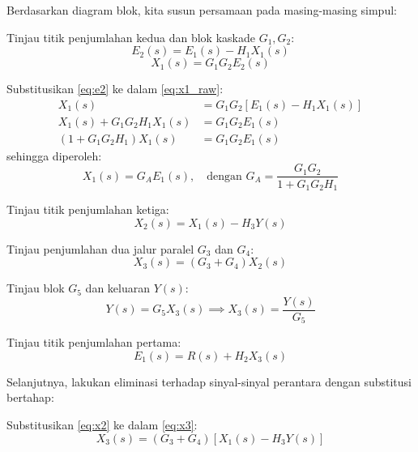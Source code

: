 \documentclass[11pt,a4paper]{article}
\begin{document}
Berdasarkan diagram blok, kita susun persamaan pada masing-masing simpul:

Tinjau titik penjumlahan kedua dan blok kaskade $G_1, G_2$:
\begin{equation}
    \label{eq:e2}
    E_2(s) = E_1(s) - H_1 X_1(s)
\end{equation}
\begin{equation}
    \label{eq:x1_raw}
    X_1(s) = G_1 G_2 E_2(s)
\end{equation}

Substitusikan \eqref{eq:e2} ke dalam \eqref{eq:x1_raw}:
\begin{align*}
    X_1(s) &= G_1 G_2 \left[ E_1(s) - H_1 X_1(s) \right] \\
    X_1(s) + G_1 G_2 H_1 X_1(s) &= G_1 G_2 E_1(s) \\
    (1 + G_1 G_2 H_1) X_1(s) &= G_1 G_2 E_1(s)
\end{align*}
sehingga diperoleh:
\begin{equation}
    \label{eq:x1}
    X_1(s) = G_A E_1(s), \quad \text{dengan } G_A = \frac{G_1 G_2}{1 + G_1 G_2 H_1}
\end{equation}

Tinjau titik penjumlahan ketiga:
\begin{equation}
    \label{eq:x2}
    X_2(s) = X_1(s) - H_3 Y(s)
\end{equation}

Tinjau penjumlahan dua jalur paralel $G_3$ dan $G_4$:
\begin{equation}
    \label{eq:x3}
    X_3(s) = (G_3 + G_4) X_2(s)
\end{equation}

Tinjau blok $G_5$ dan keluaran $Y(s)$:
\begin{equation}
    \label{eq:y}
    Y(s) = G_5 X_3(s) \implies X_3(s) = \frac{Y(s)}{G_5}
\end{equation}

Tinjau titik penjumlahan pertama:
\begin{equation}
    \label{eq:e1}
    E_1(s) = R(s) + H_2 X_3(s)
\end{equation}

Selanjutnya, lakukan eliminasi terhadap sinyal-sinyal perantara dengan substitusi bertahap:

Substitusikan \eqref{eq:x2} ke dalam \eqref{eq:x3}:
\begin{equation*}
    X_3(s) = (G_3 + G_4) \left[ X_1(s) - H_3 Y(s) \right]
\end{equation*}
\end{document}
